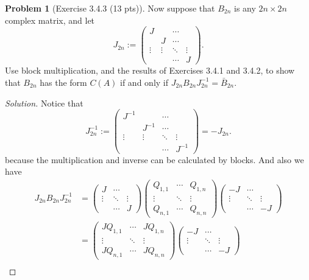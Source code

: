 \documentclass{article}
\theoremstyle{definition}
\newtheorem{problem}{Problem}
\theoremstyle{plain}
\begin{document}
\begin{problem}[Exercise 3.4.3 (13 pts)]Now suppose that $B_{2n}$ is any $2n\times2n$ complex matrix, and let
\begin{displaymath}
J_{2n}:=\begin{pmatrix}J&&\cdots&\\ &J&\cdots&\\ \vdots&\vdots&\ddots&\vdots\\ &&\cdots&J\end{pmatrix}.
\end{displaymath}
Use block multiplication, and the results of Exercises 3.4.1 and 3.4.2, to show that $B_{2n}$ has the form $C(A)$ if and only if $J_{2n}B_{2n}J_{2n}^{-1}=\bar{B}_{2n}$.
\end{problem}
\begin{adjustwidth}{0.7cm}{}
\color{blue}
\begin{proof}[Solution]Notice that
\begin{displaymath}
J_{2n}^{-1}:=\begin{pmatrix}J^{-1}&&\cdots&\\ &J^{-1}&\cdots&\\ \vdots&\vdots&\ddots&\vdots\\ &&\cdots&J^{-1}\end{pmatrix}=-J_{2n}.
\end{displaymath}
because the multiplication and inverse can be calculated by blocks. And also we have
\begin{align*}
J_{2n}B_{2n}J_{2n}^{-1}&=\begin{pmatrix}J&\cdots&\\ \vdots&\ddots&\vdots\\ &\cdots&J\end{pmatrix}\begin{pmatrix}Q_{1,1}&\cdots&Q_{1,n}\\ \vdots&\ddots&\vdots\\ Q_{n,1}&\cdots&Q_{n,n}\end{pmatrix}\begin{pmatrix}-J&\cdots&\\ \vdots&\ddots&\vdots\\ &\cdots&-J\end{pmatrix}\\
&=\begin{pmatrix}JQ_{1,1}&\cdots&JQ_{1,n}\\ \vdots&\ddots&\vdots\\ JQ_{n,1}&\cdots&JQ_{n,n}\end{pmatrix}\begin{pmatrix}-J&\cdots&\\ \vdots&\ddots&\vdots\\ &\cdots&-J\end{pmatrix}\\

\end{align*}
\end{proof}
\end{adjustwidth}
\end{document}

